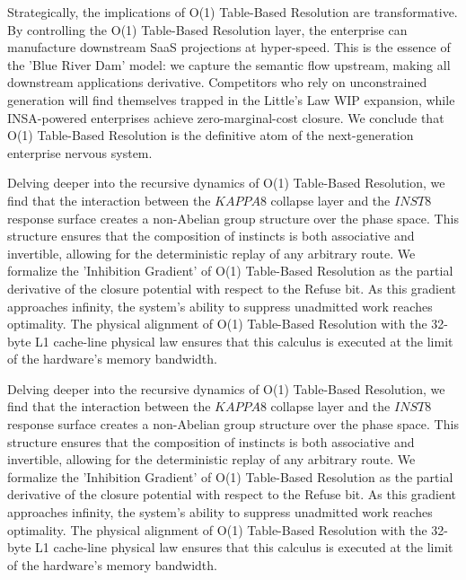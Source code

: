 \documentclass[12pt,a4paper,oneside]{book}
\begin{document}
Strategically, the implications of O(1) Table-Based Resolution are transformative. By controlling the O(1) Table-Based Resolution layer, the enterprise can manufacture downstream SaaS projections at hyper-speed. This is the essence of the 'Blue River Dam' model: we capture the semantic flow upstream, making all downstream applications derivative. Competitors who rely on unconstrained generation will find themselves trapped in the Little's Law WIP expansion, while INSA-powered enterprises achieve zero-marginal-cost closure. We conclude that O(1) Table-Based Resolution is the definitive atom of the next-generation enterprise nervous system. 

Delving deeper into the recursive dynamics of O(1) Table-Based Resolution, we find that the interaction between the $KAPPA8$ collapse layer and the $INST8$ response surface creates a non-Abelian group structure over the phase space. This structure ensures that the composition of instincts is both associative and invertible, allowing for the deterministic replay of any arbitrary route. We formalize the 'Inhibition Gradient' of O(1) Table-Based Resolution as the partial derivative of the closure potential with respect to the Refuse bit. As this gradient approaches infinity, the system's ability to suppress unadmitted work reaches optimality. The physical alignment of O(1) Table-Based Resolution with the 32-byte L1 cache-line physical law ensures that this calculus is executed at the limit of the hardware's memory bandwidth. 

Delving deeper into the recursive dynamics of O(1) Table-Based Resolution, we find that the interaction between the $KAPPA8$ collapse layer and the $INST8$ response surface creates a non-Abelian group structure over the phase space. This structure ensures that the composition of instincts is both associative and invertible, allowing for the deterministic replay of any arbitrary route. We formalize the 'Inhibition Gradient' of O(1) Table-Based Resolution as the partial derivative of the closure potential with respect to the Refuse bit. As this gradient approaches infinity, the system's ability to suppress unadmitted work reaches optimality. The physical alignment of O(1) Table-Based Resolution with the 32-byte L1 cache-line physical law ensures that this calculus is executed at the limit of the hardware's memory bandwidth. 
\end{document}
